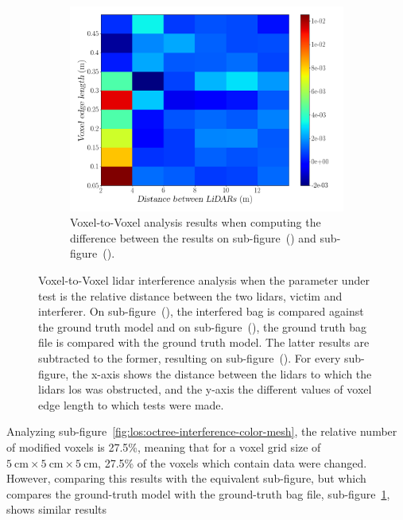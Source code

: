 \begin{figure}[!ht]
\begin{subfigure}[c]{0.45\textwidth}
	\label{fig:los:octree-ground-truth-color-mesh}
\end{subfigure}
\\ \vspace{4mm}
\begin{subfigure}[c]{0.8\textwidth}
	\includegraphics[width=\textwidth]{img/lidar-interference/LOS/octree_difference_color_mesh.png}
	\caption{Voxel-to-Voxel analysis results when computing the difference between the results on sub-figure~() and sub-figure~().}
	\label{fig:los:octree-difference-color-mesh}
\end{subfigure}

\caption{Voxel-to-Voxel \ac{lidar} interference analysis when the parameter under test is the relative distance between the two \acp{lidar}, victim and interferer. On sub-figure~(), the interfered bag is compared against the ground truth model and on sub-figure~(), the ground truth bag file is compared with the ground truth model. The latter results are subtracted to the former, resulting on sub-figure~(). For every sub-figure, the x-axis shows the distance between the \acp{lidar} to which the \acp{lidar} \ac{los} was obstructed, and the y-axis the different values of voxel edge length to which tests were made.}
\label{fig:los:octree-color-mesh}
\end{figure}

Analyzing sub-figure~\ref{fig:los:octree-interference-color-mesh}, the relative number of modified voxels is 27.5\%, meaning that for a voxel grid size of $\SI{5}{\centi\meter}\times \SI{5}{\centi\meter}\times \SI{5}{\centi\meter}$, 27.5\% of the voxels which contain data were changed. However, comparing this results with the equivalent sub-figure, but which compares the ground-truth model with the ground-truth bag file, sub-figure~\ref{fig:los:octree-ground-truth-color-mesh}, shows similar results

